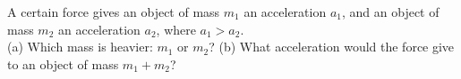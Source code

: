 A certain force gives an object of mass $m_1$ an acceleration
$a_1$, and an object of mass $m_2$ an acceleration $a_2$, where $a_1> a_2$.\\
%
(a) Which mass is heavier: $m_1$ or $m_2$?\hwendpart
%
(b) What acceleration would the force give to an object of mass $m_1+ m_2$?\answercheck
